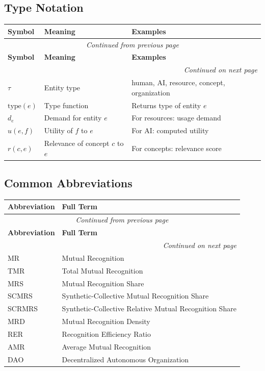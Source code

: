 \documentclass[11pt,a4paper]{article}
\theoremstyle{definition}
\theoremstyle{remark}
\begin{document}
\subsection{Type Notation}

\begin{longtable}{lll}
\toprule
\textbf{Symbol} & \textbf{Meaning} & \textbf{Examples} \\
\midrule
\endfirsthead
\multicolumn{3}{c}{\textit{Continued from previous page}} \\
\toprule
\textbf{Symbol} & \textbf{Meaning} & \textbf{Examples} \\
\midrule
\endhead
\midrule
\multicolumn{3}{r}{\textit{Continued on next page}} \\
\endfoot
\bottomrule
\endlastfoot
$\tau$ & Entity type & human, AI, resource, concept, organization \\
$\text{type}(e)$ & Type function & Returns type of entity $e$ \\
$d_e$ & Demand for entity $e$ & For resources: usage demand \\
$u(e,f)$ & Utility of $f$ to $e$ & For AI: computed utility \\
$r(c,e)$ & Relevance of concept $c$ to $e$ & For concepts: relevance score \\
\end{longtable}

\subsection{Common Abbreviations}

\begin{longtable}{ll}
\toprule
\textbf{Abbreviation} & \textbf{Full Term} \\
\midrule
\endfirsthead
\multicolumn{2}{c}{\textit{Continued from previous page}} \\
\toprule
\textbf{Abbreviation} & \textbf{Full Term} \\
\midrule
\endhead
\midrule
\multicolumn{2}{r}{\textit{Continued on next page}} \\
\endfoot
\bottomrule
\endlastfoot
MR & Mutual Recognition \\
TMR & Total Mutual Recognition \\
MRS & Mutual Recognition Share \\
SCMRS & Synthetic-Collective Mutual Recognition Share \\
SCRMRS & Synthetic-Collective Relative Mutual Recognition Share \\
MRD & Mutual Recognition Density \\
RER & Recognition Efficiency Ratio \\
AMR & Average Mutual Recognition \\
DAO & Decentralized Autonomous Organization \\
\end{longtable}
\end{document}
